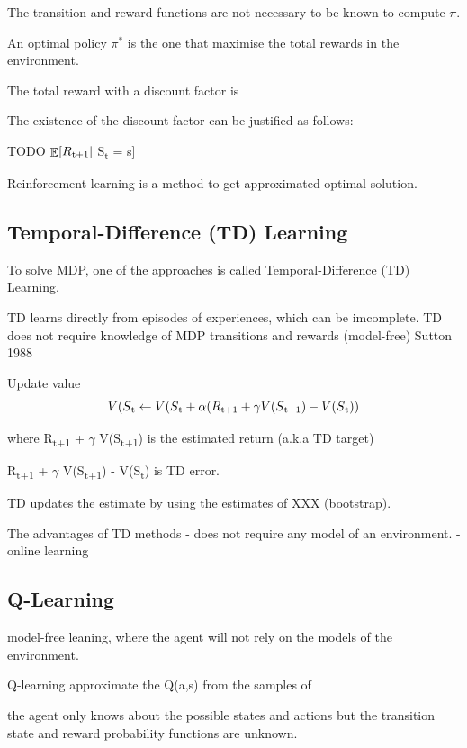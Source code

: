 \documentclass[12pt,twoside]{report}
\DeclareMathOperator{\E}{\mathbb{E}}
\begin{document}
The transition and reward functions are not necessary to be known to compute $\pi$.

An optimal policy $\pi^*$ is the one that maximise the total rewards in the environment.

The total reward with a discount factor is



The existence of the discount factor can be justified as follows:

TODO
$\displaystyle \E[R\textsubscript{t+1} \vert$ S\textsubscript{t} = s]


Reinforcement learning is a method to get approximated optimal solution.


\subsection{Temporal-Difference (TD) Learning}

To solve MDP, one of the approaches is called Temporal-Difference (TD) Learning.

TD learns directly from episodes of experiences, which can be imcomplete.
TD does not require knowledge of MDP transitions and rewards (model-free)
Sutton 1988

Update value
\begin{equation}
V(S\textsubscript{t} \leftarrow V(S\textsubscript{t} + \alpha (R\textsubscript{t+1} + \gamma V(S\textsubscript{t+1}) - V(S\textsubscript{t}))
\end{equation}

where R\textsubscript{t+1} + $\gamma$ V(S\textsubscript{t+1}) is the estimated return (a.k.a TD target)

R\textsubscript{t+1} + $\gamma$ V(S\textsubscript{t+1}) - V(S\textsubscript{t}) is TD error.

TD updates the estimate by using the estimates of XXX (bootstrap).

The advantages of TD methods
- does not require any model of an environment.
- online learning
\subsection{Q-Learning}

model-free leaning, where the agent will not rely on the models of the environment.

Q-learning approximate the Q(a,s) from the samples of

the agent only knows about the possible states and actions but the transition state and reward probability functions are unknown.
\end{document}
